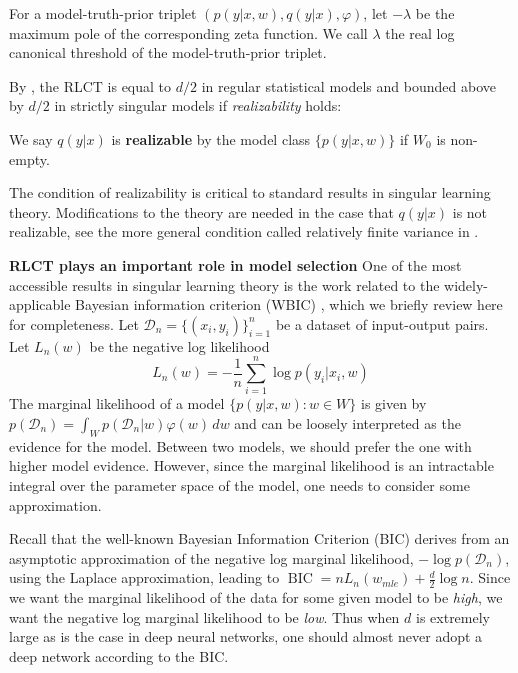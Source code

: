 \documentclass{article} %
\begin{document}
\begin{definition}
For a model-truth-prior triplet $(p(y|x,w),q(y|x),\varphi)$, let $-\lambda$ be the maximum pole of the corresponding zeta function. We call $\lambda$ the real log canonical threshold of the model-truth-prior triplet.
\label{def:RLCT}
\end{definition}

By {\citet[Theorem 6.4]{watanabe_algebraic_2009}}, the RLCT is equal to $d/2$ in regular statistical models and bounded above by $d/2$ in strictly singular models if \textit{realizability} holds:
 \begin{definition}
	We say $q(y|x)$ is \textbf{realizable} by the model class $\{p(y|x,w)\}$ if $W_0$ is non-empty.
\end{definition}
The condition of realizability is critical to standard results in singular learning theory. Modifications to the theory are needed in the case that $q(y|x)$ is not realizable, see the more general condition called relatively finite variance in \citet{watanabe_mathematical_2018}.

\textbf{RLCT plays an important role in model selection}
One of the most accessible results in singular learning theory is the work related to the widely-applicable Bayesian information criterion (WBIC) \citet{watanabe_widely_2013}, which we briefly review here for completeness.
Let $\mathcal D_n =  \{(x_i,y_i)\}_{i=1}^n$ be a dataset of input-output pairs.  
Let $L_n(w)$ be the negative log likelihood
\begin{equation}
L_n(w) = -\frac{1}{n} \sum_{i=1}^n \log p(y_i |x_i, w)
\label{eq:nll}
\end{equation}
The marginal likelihood of a model $\{p(y|x,w): w \in W\}$ is given by
$
p(\mathcal D_n) = \int_W p(\mathcal D_n|w) \varphi(w) \,dw
$
and can be loosely interpreted as the evidence for the model. Between two models, we should prefer the one with higher model evidence.
However, since the marginal likelihood is an intractable integral over the parameter space of the model, one needs to consider some approximation.

Recall that the well-known Bayesian Information Criterion (BIC) derives from an asymptotic approximation of the negative log marginal likelihood, $-\log p(\mathcal D_n)$, using the Laplace approximation, leading to
$
\operatorname{BIC} = nL_n( w_{mle}) + \frac{d}{2} \log n.
$
Since we want the marginal likelihood of the data for some given model to be \textit{high}, we want the negative log marginal likelihood to be \textit{low}. Thus when $d$ is extremely large as is the case in deep neural networks, one should almost never adopt a deep network according to the BIC. 
\end{document}

